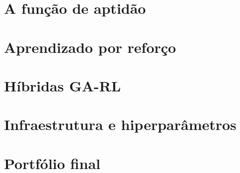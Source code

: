 \documentclass[11pt,aspectratio=169]{beamer}
\begin{document}
\section{A função de aptidão}




\section{Aprendizado por reforço}




\section{Híbridas GA-RL}


\section{Infraestrutura e hiperparâmetros}



\section{Portfólio final}


\end{document}
